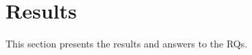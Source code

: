 

\section{Results}
\label{sec:results}

This section presents the results and answers to the RQs.





